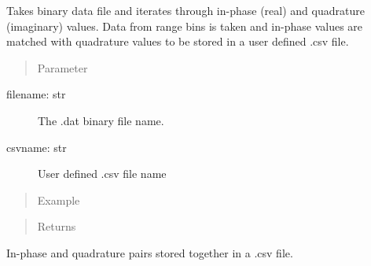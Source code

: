 \documentclass[letterpaper,10pt,english]{sphinxmanual}
\begin{document}
\begin{fulllineitems}
\label{\detokenize{X4 radar:X4_parser.iq_data}}
Takes binary data file and iterates through in-phase (real) and quadrature (imaginary) values.
Data from range bins is taken and in-phase values are matched with quadrature values to be stored in a user defined .csv file.
\begin{quote}\begin{description}
\item[{Parameter}] \leavevmode
\end{description}\end{quote}
\begin{description}
\item[{filename: str}] \leavevmode
The .dat binary file name.

\item[{csvname: str}] \leavevmode
User defined .csv file name

\end{description}
\begin{quote}\begin{description}
\item[{Example}] \leavevmode
\end{description}\end{quote}

\begin{sphinxVerbatim}[commandchars=\\\{\}]
\end{sphinxVerbatim}
\begin{quote}\begin{description}
\item[{Returns}] \leavevmode


\end{description}\end{quote}

In-phase and quadrature pairs stored together in a .csv file.

\end{fulllineitems}
\end{document}
